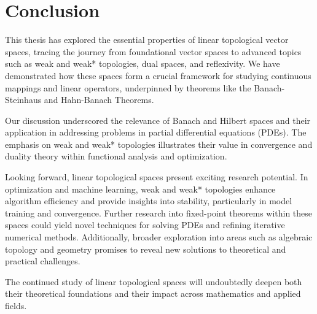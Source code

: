 \documentclass[12pt, reqno]{amsart}
\theoremstyle{definition}
\numberwithin{equation}{section}
\begin{document}
\section{Conclusion}
This thesis has explored the essential properties of linear topological vector spaces, tracing the journey from foundational vector spaces to advanced topics such as weak and weak* topologies, dual spaces, and reflexivity. We have demonstrated how these spaces form a crucial framework for studying continuous mappings and linear operators, underpinned by theorems like the Banach-Steinhaus and Hahn-Banach Theorems.

Our discussion underscored the relevance of Banach and Hilbert spaces and their application in addressing problems in partial differential equations (PDEs). The emphasis on weak and weak* topologies illustrates their value in convergence and duality theory within functional analysis and optimization.

Looking forward, linear topological spaces present exciting research potential. In optimization and machine learning, weak and weak* topologies enhance algorithm efficiency and provide insights into stability, particularly in model training and convergence. Further research into fixed-point theorems within these spaces could yield novel techniques for solving PDEs and refining iterative numerical methods. Additionally, broader exploration into areas such as algebraic topology and geometry promises to reveal new solutions to theoretical and practical challenges.

The continued study of linear topological spaces will undoubtedly deepen both their theoretical foundations and their impact across mathematics and applied fields.
\end{document}
